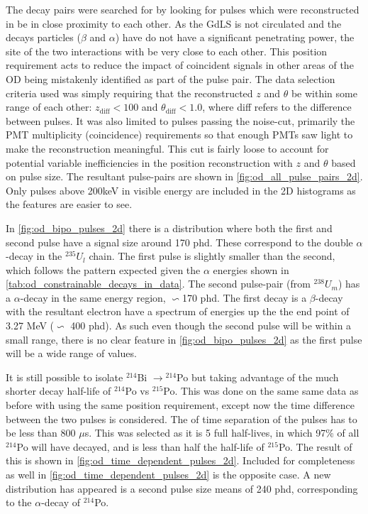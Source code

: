 \par
The decay pairs were searched for by looking for pulses which were reconstructed in be in close proximity to each other.
As the GdLS is not circulated and the decays particles ($\beta$ and $\alpha$) have do not have a significant penetrating power, the site of the two interactions with be very close to each other.
This position requirement acts to reduce the impact of coincident signals in other areas of the OD being mistakenly identified as part of the pulse pair.
The data selection criteria used was simply requiring that the reconstructed $z$ and $\theta$ be within some range of each other: $z_{\text{diff}} < 100$ and $\theta_{\text{diff}} < 1.0$, where diff refers to the difference between pulses.
It was also limited to pulses passing the noise-cut, primarily the PMT multiplicity (coincidence) requirements so that enough PMTs saw light to make the reconstruction meaningful.
This cut is fairly loose to account for potential variable inefficiencies in the position reconstruction with $z$ and $\theta$ based on pulse size.
The resultant pulse-pairs are shown in \autoref{fig:od_all_pulse_pairs_2d}.
Only pulses above 200keV in visible energy are included in the 2D histograms as the features are easier to see.



\par
In \autoref{fig:od_bipo_pulses_2d} there is a distribution where both the first and second pulse have a signal size around 170 phd.
These correspond to the double $\alpha$-decay in the ${}^{235}U_{l}$ chain.
The first pulse is slightly smaller than the second, which follows the pattern expected given the $\alpha$ energies shown in \autoref{tab:od_constrainable_decays_in_data}.
The second pulse-pair (from ${}^{238}U_{m}$) has a $\alpha$-decay in the same energy region, $\backsim$170 phd.
The first decay is a $\beta$-decay with the resultant electron have a spectrum of energies up the the end point of 3.27 MeV ($\backsim$ 400 phd).
As such even though the second pulse will be within a small range, there is no clear feature in \autoref{fig:od_bipo_pulses_2d} as the first pulse will be a wide range of values.

\par
It is still possible to isolate ${}^{214}$Bi $\to {}^{214}$Po but taking advantage of the much shorter decay half-life of ${}^{214}$Po vs ${}^{215}$Po.
This was done on the same same data as before with using the same position requirement, except now the time difference between the two pulses is considered.
The of time separation of the pulses has to be less than 800 $\mu$s.
This was selected as it is 5 full half-lives, in which 97\% of all ${}^{214}$Po will have decayed, and is less than half the half-life of ${}^{215}$Po.
The result of this is shown in \autoref{fig:od_time_dependent_pulses_2d}.
Included for completeness as well in \autoref{fig:od_time_dependent_pulses_2d} is the opposite case.
A new distribution has appeared is a second pulse size means of 240 phd, corresponding to the $\alpha$-decay of ${}^{214}$Po.

